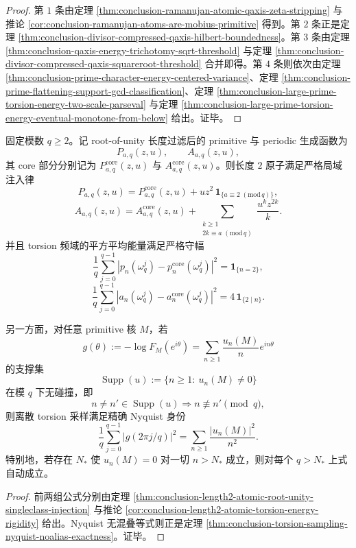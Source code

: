 \begin{proof}
第 \(1\) 条由定理 \ref{thm:conclusion-ramanujan-atomic-qaxis-zeta-stripping} 与推论 \ref{cor:conclusion-ramanujan-atoms-are-mobius-primitive} 得到。第 \(2\) 条正是定理 \ref{thm:conclusion-divisor-compressed-qaxis-hilbert-boundedness}。第 \(3\) 条由定理 \ref{thm:conclusion-qaxis-energy-trichotomy-sqrt-threshold} 与定理 \ref{thm:conclusion-divisor-compressed-qaxis-squareroot-threshold} 合并即得。第 \(4\) 条则依次由定理 \ref{thm:conclusion-prime-character-energy-centered-variance}、定理 \ref{thm:conclusion-prime-flattening-support-gcd-classification}、定理 \ref{thm:conclusion-large-prime-torsion-energy-two-scale-parseval} 与定理 \ref{thm:conclusion-large-prime-torsion-energy-eventual-monotone-from-below} 给出。证毕。
\end{proof}

\begin{theorem}\label{thm:conclusion-length2-atom-nyquist-rigidity}
固定模数 \(q\ge 2\)。记 root-of-unity 长度过滤后的 primitive 与 periodic 生成函数为
\[
P_{a,q}(z,u),
\qquad
A_{a,q}(z,u),
\]
其 core 部分分别记为 \(P_{a,q}^{\mathrm{core}}(z,u)\) 与 \(A_{a,q}^{\mathrm{core}}(z,u)\)。则长度 \(2\) 原子满足严格局域注入律
\[
P_{a,q}(z,u)
=
P_{a,q}^{\mathrm{core}}(z,u)+uz^2\,\mathbf 1_{\{a\equiv 2\;(\mathrm{mod}\,q)\}},
\]
\[
A_{a,q}(z,u)
=
A_{a,q}^{\mathrm{core}}(z,u)
+
\sum_{\substack{k\ge 1\\ 2k\equiv a\;(\mathrm{mod}\,q)}}\frac{u^kz^{2k}}{k}.
\]
并且 torsion 频域的平方平均能量满足严格守幅
\[
\frac1q\sum_{j=0}^{q-1}
\left|p_n(\omega_q^j)-p_n^{\mathrm{core}}(\omega_q^j)\right|^2
=
\mathbf 1_{\{n=2\}},
\]
\[
\frac1q\sum_{j=0}^{q-1}
\left|a_n(\omega_q^j)-a_n^{\mathrm{core}}(\omega_q^j)\right|^2
=
4\,\mathbf 1_{\{2\mid n\}}.
\]

另一方面，对任意 primitive 核 \(M\)，若
\[
g(\theta):=-\log F_M(e^{i\theta})
=
\sum_{n\ge 1}\frac{u_n(M)}{n}e^{in\theta}
\]
的支撑集
\[
\operatorname{Supp}(u):=\{n\ge 1:\ u_n(M)\neq 0\}
\]
在模 \(q\) 下无碰撞，即
\[
n\neq n'\in \operatorname{Supp}(u)\Longrightarrow n\not\equiv n'\pmod q,
\]
则离散 torsion 采样满足精确 Nyquist 身份
\[
\frac1q\sum_{j=0}^{q-1}|g(2\pi j/q)|^2
=
\sum_{n\ge 1}\frac{|u_n(M)|^2}{n^2}.
\]
特别地，若存在 \(N_\ast\) 使 \(u_n(M)=0\) 对一切 \(n>N_\ast\) 成立，则对每个 \(q>N_\ast\) 上式自动成立。
\end{theorem}
\begin{proof}
前两组公式分别由定理 \ref{thm:conclusion-length2-atomic-root-unity-singleclass-injection} 与推论 \ref{cor:conclusion-length2-atomic-torsion-energy-rigidity} 给出。Nyquist 无混叠等式则正是定理 \ref{thm:conclusion-torsion-sampling-nyquist-noalias-exactness}。证毕。
\end{proof}

